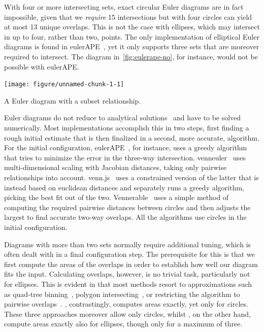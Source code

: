 \documentclass[
  oneside,
  openany,
  numbers=noendperiod,
  parskip=half,
  bibliography=totoc
]{scrbook}\usepackage[]{graphicx}\usepackage{xcolor}
\newenvironment{knitrout}{}{} %
\newcommand{\pkg}[1]{{\fontseries{b}\selectfont #1}}
\begin{document}
With four or more intersecting sets, exact circular Euler diagrams are in fact
impossible, given that we \emph{require} 15 intersections but with four circles
can yield at most 13 unique overlaps. This is not the case with ellipses, which
may intersect in up to four, rather than two, points. The only implementation of
elliptical Euler diagrams is found in \pkg{eulerAPE}~\citep{Micallef_2014a}, yet
it only supports three sets that are moreover required to intersect. The
diagram in~\cref{fig:eulerape-no}, for instance, would not be possible
with \pkg{eulerAPE}.

\begin{marginfigure}
\begin{knitrout}\small
{}\color{fgcolor}

{\centering \texttt{[image: figure/unnamed-chunk-1-1]}

}



\end{knitrout}
\caption{A Euler diagram with a subset relationship.}
\label{fig:eulerape-no}
\end{marginfigure}

Euler diagrams do not reduce to analytical solutions~\citep{Chow_2007} and have
to be solved numerically. Most implementations accomplish this in two steps,
first finding a rough initial estimate that is then finalized in a second, more
accurate, algorithm. For the initial configuration,
\pkg{eulerAPE}~\citep{Micallef_2013}, for instance, uses a greedy algorithm that
tries to minimize the error in the three-way intersection.
\pkg{venneuler}~\citep{Wilkinson_2012} uses multi-dimensional scaling with
Jacobian distances, taking only pairwise relationships into account.
\pkg{venn.js}~\citep{Frederickson_2016} uses a constrained version of the latter
that is instead based on euclidean distances and separately runs a greedy
algorithm, picking the best fit out of the two.
\pkg{Vennerable}~\citep{Swinton_2011} uses a simple method of computing the
required pairwise distances between circles and then adjusts the largest to
find accurate two-way overlaps. All the algorithms use
circles in the initial configuration.

Diagrams with more than two sets normally require additional tuning, which is often
dealt with in a final configuration step. The prerequisite for this is that
we first compute the areas of the overlaps in order to establish how well our
diagram fits the input. Calculating overlaps, however, is no trivial task,
particularly not for ellipses. This is evident in that most methods resort to
approximations such as quad-tree binning~\citep{Wilkinson_2012}, polygon
intersecting~\citep{Kestler_2008}, or restricting the algorithm to pairwise
overlaps~\citep{Swinton_2011}. \citet{Frederickson_2016}, contrastingly,
computes areas exactly, yet only for circles. These three approaches moreover allow only
circles, whilst \citet{Micallef_2014a}, on the other hand, compute areas exactly
also for ellipses, though only for a maximum of three.
\end{document}

